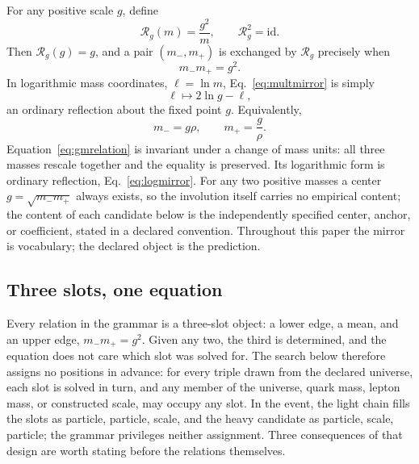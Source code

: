 \documentclass[aps,twocolumn,superscriptaddress,nofootinbib,floatfix]{revtex4-2}
\newcommand{\RR}{\mathcal R}
\begin{document}
For any positive scale $g$, define
\begin{equation}
\RR_g(m)=\frac{g^2}{m},
\qquad
\RR_g^2=\mathrm{id}.
\label{eq:multmirror}
\end{equation}
Then $\RR_g(g)=g$, and a pair $(m_-,m_+)$ is exchanged by $\RR_g$ precisely when
\begin{equation}
m_-m_+=g^2.
\label{eq:gmrelation}
\end{equation}
In logarithmic mass coordinates, $\ell=\ln m$, Eq.~\eqref{eq:multmirror} is simply
\begin{equation}
\ell\longmapsto2\ln g-\ell,
\label{eq:logmirror}
\end{equation}
an ordinary reflection about the fixed point $g$.
Equivalently,
\begin{equation}
m_-=g\rho,
\qquad
m_+=\frac{g}{\rho}.
\label{eq:centered}
\end{equation}
Equation~\eqref{eq:gmrelation} is invariant under a change of mass units: all three masses rescale together and the equality is preserved. Its logarithmic form is ordinary reflection, Eq.~\eqref{eq:logmirror}. For any two positive masses a center $g=\sqrt{m_-m_+}$ always exists, so the involution itself carries no empirical content; the content of each candidate below is the independently specified center, anchor, or coefficient, stated in a declared convention. Throughout this paper the mirror is vocabulary; the declared object is the prediction.

\subsection{Three slots, one equation}
\label{sec:slots}

Every relation in the grammar is a three-slot object: a lower edge, a mean, and an upper edge, $m_-m_+=g^2$. Given any two, the third is determined, and the equation does not care which slot was solved for. The search below therefore assigns no positions in advance: for every triple drawn from the declared universe, each slot is solved in turn, and any member of the universe, quark mass, lepton mass, or constructed scale, may occupy any slot. In the event, the light chain fills the slots as particle, particle, scale, and the heavy candidate as particle, scale, particle; the grammar privileges neither assignment. Three consequences of that design are worth stating before the relations themselves.
\end{document}
